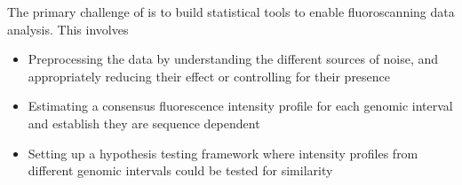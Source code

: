 \begin{tcolorbox}[colback=green!5,colframe=green!40!black,title=Statistical challenges] %
The primary challenge of is to build statistical tools to enable fluoroscanning data analysis. This involves
\begin{itemize}
\item Preprocessing the data by understanding the different sources of noise, and appropriately reducing their effect or controlling for their presence
\item Estimating a consensus fluorescence intensity profile for each genomic interval and establish they are sequence dependent
\item Setting up a hypothesis testing framework where intensity profiles from different genomic intervals could be tested for similarity
\end{itemize}
\end{tcolorbox}


